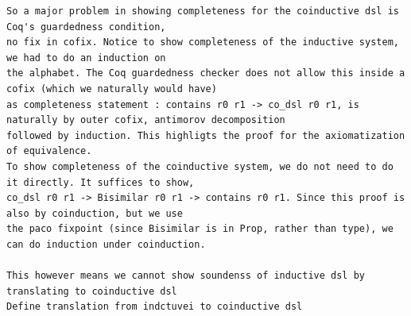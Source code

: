 \begin{verbatim}
So a major problem in showing completeness for the coinductive dsl is Coq's guardedness condition,
no fix in cofix. Notice to show completeness of the inductive system, we had to do an induction on
the alphabet. The Coq guardedness checker does not allow this inside a cofix (which we naturally would have)
as completeness statement : contains r0 r1 -> co_dsl r0 r1, is naturally by outer cofix, antimorov decomposition
followed by induction. This highligts the proof for the axiomatization of equivalence. 
To show completeness of the coinductive system, we do not need to do it directly. It suffices to show,
co_dsl r0 r1 -> Bisimilar r0 r1 -> contains r0 r1. Since this proof is also by coinduction, but we use 
the paco fixpoint (since Bisimilar is in Prop, rather than type), we can do induction under coinduction.

This however means we cannot show soundenss of inductive dsl by translating to coinductive dsl
Define translation from indctuvei to coinductive dsl


\end{verbatim}


